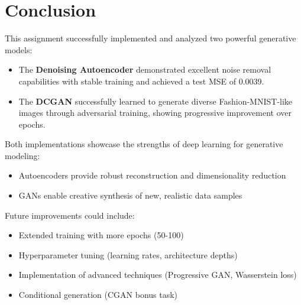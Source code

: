 \documentclass[11pt,a4paper]{article}
\begin{document}
\section{Conclusion}

This assignment successfully implemented and analyzed two powerful generative models:

\begin{itemize}
    \item The \textbf{Denoising Autoencoder} demonstrated excellent noise removal capabilities with stable training and achieved a test MSE of 0.0039.
    \item The \textbf{DCGAN} successfully learned to generate diverse Fashion-MNIST-like images through adversarial training, showing progressive improvement over epochs.
\end{itemize}

Both implementations showcase the strengths of deep learning for generative modeling:
\begin{itemize}
    \item Autoencoders provide robust reconstruction and dimensionality reduction
    \item GANs enable creative synthesis of new, realistic data samples
\end{itemize}

Future improvements could include:
\begin{itemize}
    \item Extended training with more epochs (50-100)
    \item Hyperparameter tuning (learning rates, architecture depths)
    \item Implementation of advanced techniques (Progressive GAN, Wasserstein loss)
    \item Conditional generation (CGAN bonus task)
\end{itemize}
\end{document}
